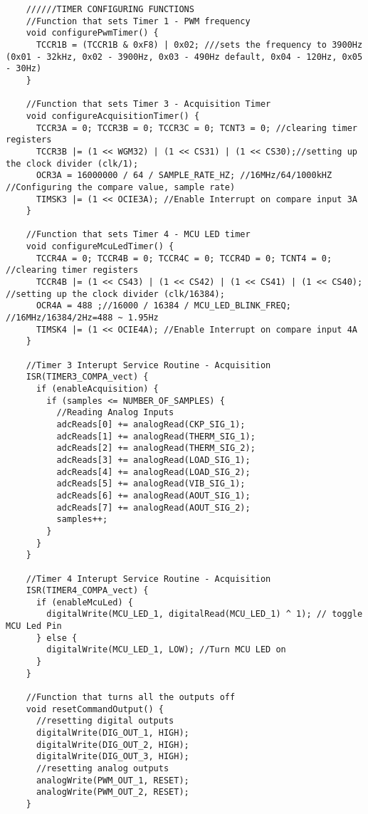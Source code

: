 \begin{lstlisting}
    //////TIMER CONFIGURING FUNCTIONS
    //Function that sets Timer 1 - PWM frequency
    void configurePwmTimer() {
      TCCR1B = (TCCR1B & 0xF8) | 0x02; ///sets the frequency to 3900Hz (0x01 - 32kHz, 0x02 - 3900Hz, 0x03 - 490Hz default, 0x04 - 120Hz, 0x05 - 30Hz)
    }

    //Function that sets Timer 3 - Acquisition Timer
    void configureAcquisitionTimer() {
      TCCR3A = 0; TCCR3B = 0; TCCR3C = 0; TCNT3 = 0; //clearing timer registers
      TCCR3B |= (1 << WGM32) | (1 << CS31) | (1 << CS30);//setting up the clock divider (clk/1);
      OCR3A = 16000000 / 64 / SAMPLE_RATE_HZ; //16MHz/64/1000kHZ //Configuring the compare value, sample rate)
      TIMSK3 |= (1 << OCIE3A); //Enable Interrupt on compare input 3A
    }

    //Function that sets Timer 4 - MCU LED timer
    void configureMcuLedTimer() {
      TCCR4A = 0; TCCR4B = 0; TCCR4C = 0; TCCR4D = 0; TCNT4 = 0; //clearing timer registers
      TCCR4B |= (1 << CS43) | (1 << CS42) | (1 << CS41) | (1 << CS40); //setting up the clock divider (clk/16384);
      OCR4A = 488 ;//16000 / 16384 / MCU_LED_BLINK_FREQ; //16MHz/16384/2Hz=488 ~ 1.95Hz
      TIMSK4 |= (1 << OCIE4A); //Enable Interrupt on compare input 4A
    }

    //Timer 3 Interupt Service Routine - Acquisition
    ISR(TIMER3_COMPA_vect) {
      if (enableAcquisition) {
        if (samples <= NUMBER_OF_SAMPLES) {
          //Reading Analog Inputs
          adcReads[0] += analogRead(CKP_SIG_1);
          adcReads[1] += analogRead(THERM_SIG_1);
          adcReads[2] += analogRead(THERM_SIG_2);
          adcReads[3] += analogRead(LOAD_SIG_1);
          adcReads[4] += analogRead(LOAD_SIG_2);
          adcReads[5] += analogRead(VIB_SIG_1);
          adcReads[6] += analogRead(AOUT_SIG_1);
          adcReads[7] += analogRead(AOUT_SIG_2);
          samples++;
        }
      }
    }

    //Timer 4 Interupt Service Routine - Acquisition
    ISR(TIMER4_COMPA_vect) {
      if (enableMcuLed) {
        digitalWrite(MCU_LED_1, digitalRead(MCU_LED_1) ^ 1); // toggle MCU Led Pin
      } else {
        digitalWrite(MCU_LED_1, LOW); //Turn MCU LED on
      }
    }

    //Function that turns all the outputs off
    void resetCommandOutput() {
      //resetting digital outputs
      digitalWrite(DIG_OUT_1, HIGH);
      digitalWrite(DIG_OUT_2, HIGH);
      digitalWrite(DIG_OUT_3, HIGH);
      //resetting analog outputs
      analogWrite(PWM_OUT_1, RESET);
      analogWrite(PWM_OUT_2, RESET);
    }


\end{lstlisting}
